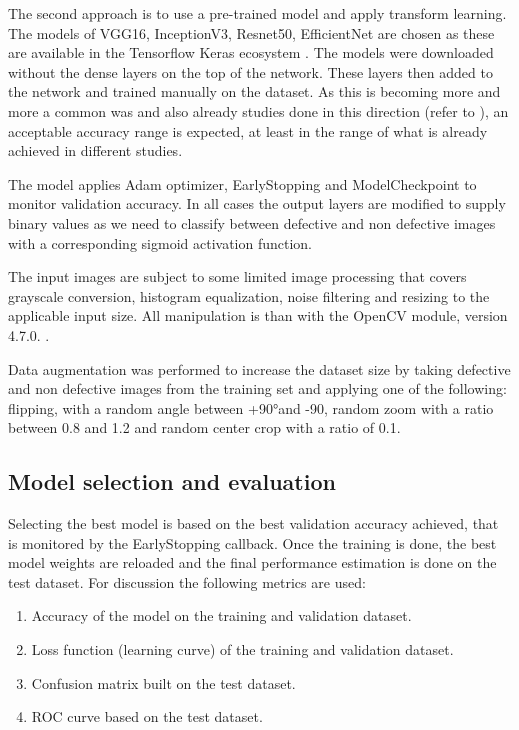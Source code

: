 \documentclass[10pt, final]{article}
\begin{document}
The second approach is to use a pre-trained model and apply transform learning.
The models of VGG16, InceptionV3, Resnet50, EfficientNet are chosen as these are available in the Tensorflow
Keras ecosystem \cite{keras_applications}.
The models were downloaded without the dense layers on the top of the network.
These layers then added to the network and trained manually on the dataset.
As this is becoming more and more a common was and also already studies done in this direction
(refer to \cite{_railway_}), an acceptable accuracy range is expected, at least in the range of what is already
achieved in different studies.

The model applies Adam optimizer, EarlyStopping and ModelCheckpoint to monitor validation accuracy.
In all cases the output layers are modified to supply binary values as we need to classify between defective and
non defective images with a corresponding sigmoid activation function.

The input images are subject to some limited image processing that covers grayscale conversion, histogram equalization,
noise filtering and resizing to the applicable input size.
All manipulation is than with the OpenCV module, version 4.7.0. \cite{_home_}.

Data augmentation was performed to increase the dataset size by taking defective and non defective images
from the training set and applying one of the following: flipping, with a random angle between +90°and -90,
random zoom with a ratio between 0.8 and 1.2 and random center crop with a ratio of 0.1.

\subsection{Model selection and evaluation}
Selecting the best model is based on the best validation accuracy achieved, that is monitored by the EarlyStopping
callback.
Once the training is done, the best model weights are reloaded and the final performance estimation is done
on the test dataset.
For discussion the following metrics are used:
\begin{enumerate}
	\item Accuracy of the model on the training and validation dataset.
	\item Loss function (learning curve) of the training and validation dataset.
	\item Confusion matrix built on the test dataset.
	\item ROC curve based on the test dataset.
\end{enumerate}
\end{document}
